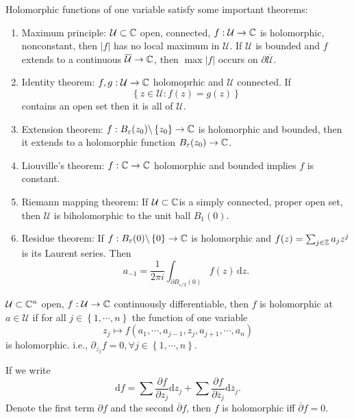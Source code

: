 Holomorphic functions of one variable satisfy some important theorems:
\begin{enumerate}
  \item Maximum principle: $\mathcal{U}\subset \mathbb{C}$ open, connected, $f:\mathcal{U}\to \mathbb{C}$ is holomorphic, nonconstant, then $|f|$ has no local maximum in $\mathcal{U}$. If $\mathcal{U}$ is bounded and $f$ extends to a continuous $\overline{\mathcal{U}}\to \mathbb{C}$, then $\max |f|$ occurs on $\partial \overline{\mathcal{U}}$.
  \item Identity theorem: $f,g:\mathcal{U}\to \mathbb{C}$ holomoprhic and $\mathcal{U}$ connected. If $$\left\{z\in \mathcal{U}:f(z)=g(z)\right\} $$ contains an open set then it is all of $\mathcal{U}$.
  \item Extension theorem: $f:B_\varepsilon (z_0) \backslash  \left\{z_0\right\} \to \mathbb{C}$ is holomorphic and bounded, then it extends to a holomorphic function $B_{\varepsilon }(z_0)\to \mathbb{C}$.
  \item Liouville's theorem: $f:\mathbb{C}\to \mathbb{C}$ holomorphic and bounded implies $f$ is constant.
  \item Riemann mapping theorem: If $\mathcal{U}\subset \mathbb{C}$is a simply connected, proper open set, then $\mathcal{U}$ is biholomorphic to the unit ball $B_1(0)$.
  \item Residue theorem: If $f:B_\varepsilon (0) \backslash  \left\{0\right\} \to \mathbb{C}$ is holomorphic and $f(z)=\sum_{j\in \mathbb{Z}}^{} a_jz^{j}$ is its Laurent series. Then
    \[
      a_{-1}=\frac{1}{2\pi i}\int_{\partial B_{\varepsilon  /2}(0)}f(z)\,\mathrm{d}z.
    \] 
\end{enumerate}


\begin{definition}
  $\mathcal{U}\subset \mathbb{C}^{n}$ open, $f:\mathcal{U}\to \mathbb{C}$ continuously differentiable,  then $f$ is holomorphic at $a\in \mathcal{U}$ if for all $j\in \left\{1,\cdots ,n\right\} $ the function of one variable 
  \[
    z_j\mapsto f(a_1,\cdots ,a_{j-1}, z_j, a_{j+1},\cdots ,a_n)
  \] is holomorphic. i.e., $\partial_{\overline{z_j}}f=0,\forall j \in \left\{1,\cdots ,n\right\} $.
\end{definition}
If we write 
\[
\mathrm{d}f=\sum \frac{\partial f}{\partial z_j} \mathrm{d}z_j+\sum \frac{\partial f}{\partial \overline{z}_j} \mathrm{d}\overline{z}_j.
\] 
Denote the first term $\partial f$ and the second $\overline{\partial}f$, then $f$ is holomorphic iff $\overline{\partial}f=0$.

